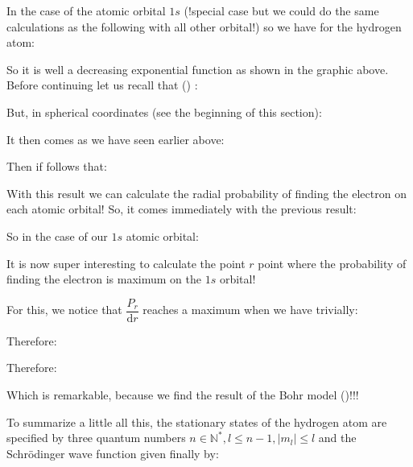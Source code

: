 	In the case of the atomic orbital $1s$ (!special case but we could do the same calculations as the following with all other orbital!) so we have for the hydrogen atom:
	
	So it is well a decreasing exponential function as shown in the graphic above. Before continuing let us recall that () :
	
	But, in spherical coordinates (see the beginning of this section):
	
	It then comes as we have seen earlier above:
	
	Then if follows that:
	
	With this result we can calculate the radial probability of finding the electron on each atomic orbital! So, it comes immediately with the previous result:
	
	So in the case of our $1s$ atomic orbital:
	
	It is now super interesting to calculate the point $r$ point where the probability of finding the electron is maximum on the $1s$ orbital!

	For this, we notice that $\dfrac{P_r}{\mathrm{d}r}$ reaches a maximum when we have trivially:
	
	Therefore:
	
	Therefore:
	
	Which is remarkable, because we find the result of the Bohr model ()!!!

	To summarize a little all this, the stationary states of the hydrogen atom are specified by three quantum numbers $n\in\mathbb{N}^{*},l\leq n-1,|m_l|\leq l$ and the Schrödinger wave function given finally by:
	

